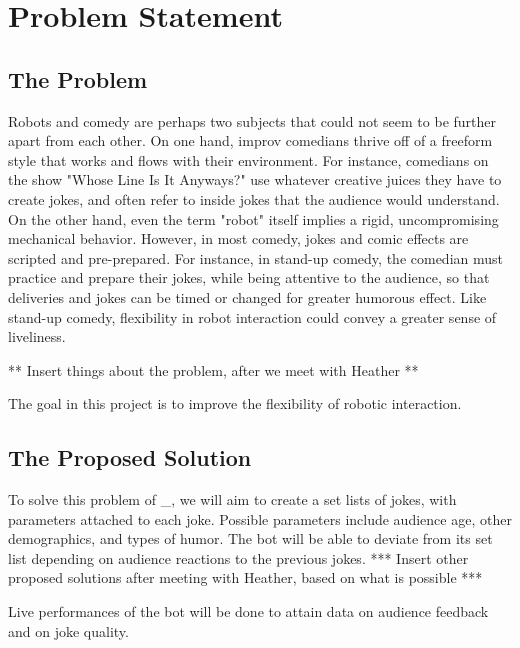 \documentclass[onecolumn, draftclsnofoot,10pt, compsoc]{IEEEtran}
\begin{document}
\section{Problem Statement}

\subsection{The Problem}

Robots and comedy are perhaps two subjects that could not seem to be further apart from each other.
On one hand, improv comedians thrive off of a freeform style that works and flows with their environment.
For instance, comedians on the show "Whose Line Is It Anyways?" use whatever creative juices they have to create jokes, and often refer to inside jokes that the audience would understand.
On the other hand, even the term "robot" itself implies a rigid, uncompromising mechanical behavior.
However, in most comedy, jokes and comic effects are scripted and pre-prepared.
For instance, in stand-up comedy, the comedian must practice and prepare their jokes, while being attentive to the audience, so that deliveries and jokes can be timed or changed for greater humorous effect.
Like stand-up comedy, flexibility in robot interaction could convey a greater sense of liveliness.

** Insert things about the problem, after we meet with Heather **

The goal in this project is to improve the flexibility of robotic interaction.

\subsection{The Proposed Solution}


To solve this problem of \_, we will aim to create a set lists of jokes, with parameters attached to each joke.
Possible parameters include audience age, other demographics, and types of humor.
The bot will be able to deviate from its set list depending on audience reactions to the previous jokes.
*** Insert other proposed solutions after meeting with Heather, based on what is possible ***

Live performances of the bot will be done to attain data on audience feedback and on joke quality.


\end{document}
